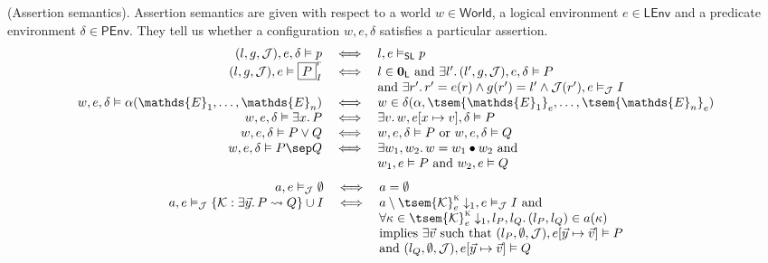  (Assertion semantics). Assertion semantics are given with respect to a world $w \in \mathsf{World}$, a logical environment $e \in \mathsf{LEnv}$ and a predicate environment $\delta \in \mathsf{PEnv}$. They tell us whether a configuration $w, e, \delta$ satisfies a particular assertion.
\begingroup
\renewcommand*{\arraystretch}{1.5}
\[
\begin{array}{r c l}
	(l, g, \mathcal{J}), e, \delta \vDash p
	&
	\iff
	&
	l, e \vDash_\mathsf{SL} p
\\
	(l, g, \mathcal{J}), e \vDash \boxed{P}_I^r
	&
	\iff
	&
	l \in \mathbf{0}_\mathsf{L} \text{ and } \exists l' \ldotp (l', g, \mathcal{J}), e, \delta \vDash P
	\\ && \text{and } \exists r' \ldotp r' = e(r) \land g(r') = l' \land \mathcal{J}(r'), e \vDash_\mathcal{J} I
\\
	w, e, \delta \vDash \alpha(\mathds{E}_1, \ldots, \mathds{E}_n)
	&
	\iff
	&
	w \in \delta(\alpha, \tsem{\mathds{E}_1}_e, \ldots, \tsem{\mathds{E}_n}_e)
\\
	w, e, \delta \vDash \exists x \ldotp P
	&
	\iff
	&
	\exists v \ldotp w, e[x \mapsto v], \delta \vDash P
\\
	w, e, \delta \vDash P \lor Q
	&
	\iff
	&
	w, e, \delta \vDash P \text{ or } w, e, \delta \vDash Q
\\
	w, e, \delta \vDash P \sep Q
	&
	\iff
	&
	\exists w_1, w_2 \ldotp w = w_1 \bullet w_2 \text{ and } \\ && w_1, e \vDash P \text{ and } w_2, e \vDash Q
\end{array}
\]
\[
\begin{array}{r c l}
	a, e \vDash_\mathcal{J} \emptyset
	&
	\iff	
	&
	a = \emptyset
\\
	a, e \vDash_\mathcal{J} \{ \mathcal{K} : \exists \vec{y} \ldotp P \leadsto Q \} \cup I
	&
	\iff
	&
	a \setminus \tsem{\mathcal{K}}_e^\textsc{k} \downarrow_1, e \vDash_\mathcal{J} I \text{ and } \\ && \forall \kappa \in \tsem{\mathcal{K}}_e^\textsc{k} \downarrow_1, l_P, l_Q \ldotp (l_P, l_Q) \in a(\kappa) \\ && \text{implies } \exists \vec{v} \text{ such that } (l_P, \emptyset, \mathcal{J}), e[\vec{y} \mapsto \vec{v}] \vDash P \\ && \text{and } (l_Q, \emptyset, \mathcal{J}), e[\vec{y} \mapsto \vec{v}] \vDash Q
\end{array}
\]

